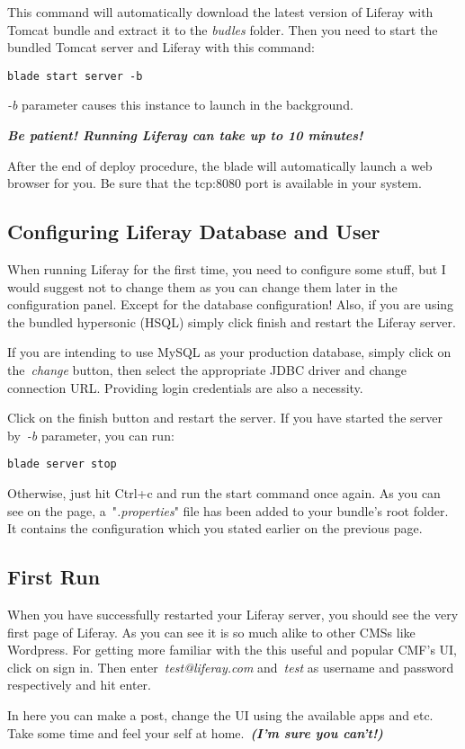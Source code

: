 This command will automatically download the latest version of Liferay with Tomcat bundle and extract it to the \textit{budles} folder.
Then you need to start the bundled Tomcat server and Liferay with this command:

\lstset{language=bash}
\begin{lstlisting}
blade start server -b
\end{lstlisting}

\textit{-b} parameter causes this instance to launch in the background.

\textbf{\textit{Be patient! Running Liferay can take up to 10 minutes!}}

After the end of deploy procedure, the blade will automatically launch a web browser for you. Be sure that the tcp:8080 port is available in your system.

\subsection{Configuring Liferay Database and User}

When running Liferay for the first time, you need to configure some stuff, but I would suggest not to change them as you can change them later in the configuration panel. Except for the database configuration! Also, if you are using the bundled hypersonic (HSQL) simply click finish and restart the Liferay server.

If you are intending to use MySQL as your production database, simply click on the \textit{change} button, then select the appropriate JDBC driver and change connection URL. Providing login credentials are also a necessity.

Click on the finish button and restart the server. If you have started the server by \textit{-b} parameter, you can run:

\begin{lstlisting}
blade server stop
\end{lstlisting}

Otherwise, just hit Ctrl+c and run the start command once again. As you can see on the page, a "\textit{.properties}" file has been added to your bundle's root folder. It contains the configuration which you stated earlier on the previous page.

\subsection{First Run}

When you have successfully restarted your Liferay server, you should see the very first page of Liferay. As you can see it is so much alike to other CMSs like Wordpress. For getting more familiar with the this useful and popular CMF's UI, click on sign in. Then enter \textit{test@liferay.com} and \textit{test} as username and password respectively and hit enter.

In here you can make a post, change the UI using the available apps and etc. Take some time and feel your self at home. \textit{\textbf{(I'm sure you can't!)}}

